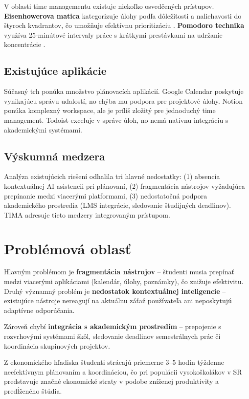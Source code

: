 \documentclass[10pt,twocolumn,twoside,slovak,a4paper]{article}
\begin{document}
V oblasti time managementu existuje niekoľko osvedčených prístupov. \textbf{Eisenhowerova matica} kategorizuje úlohy podľa dôležitosti a naliehavosti do štyroch kvadrantov, čo umožňuje efektívnu prioritizáciu \cite{eisenhower}. \textbf{Pomodoro technika} využíva 25-minútové intervaly práce s krátkymi prestávkami na udržanie koncentrácie \cite{pomodoro}.

\subsection{Existujúce aplikácie}

Súčasný trh ponúka množstvo plánovacích aplikácií. Google Calendar poskytuje vynikajúcu správu udalostí, no chýba mu podpora pre projektové úlohy. Notion ponúka komplexný workspace, ale je príliš zložitý pre jednoduchý time management. Todoist exceluje v správe úloh, no nemá natívnu integráciu s akademickými systémami.

\subsection{Výskumná medzera}

Analýza existujúcich riešení odhalila tri hlavné nedostatky: (1) absencia kontextuálnej AI asistencii pri plánovaní, (2) fragmentácia nástrojov vyžadujúca prepínanie medzi viacerými platformami, (3) nedostatočná podpora akademického prostredia (LMS integrácie, sledovanie študijných deadlinov). TIMA adresuje tieto medzery integrovaným prístupom.

\section{Problémová oblasť}

Hlavným problémom je \textbf{fragmentácia nástrojov} -- študenti musia prepínať medzi viacerými aplikáciami (kalendár, úlohy, poznámky), čo znižuje efektivitu. Druhý významný problém je \textbf{nedostatok kontextuálnej inteligencie} -- existujúce nástroje nereagují na aktuálnu záťaž používateľa ani neposkytujú adaptívne odporúčania.

Zároveň chybí \textbf{integrácia s akademickým prostredím} -- prepojenie s rozvrhovými systémami škôl, sledovanie deadlinov semestrálnych prác či koordinácia skupinových projektov.

Z ekonomického hľadiska študenti strácajú priemerne 3--5 hodín týždenne neefektívnym plánovaním a koordináciou, čo pri populácii vysokoškolákov v SR predstavuje značné ekonomické straty v podobe zníženej produktivity a predĺženého štúdia.
\end{document}

